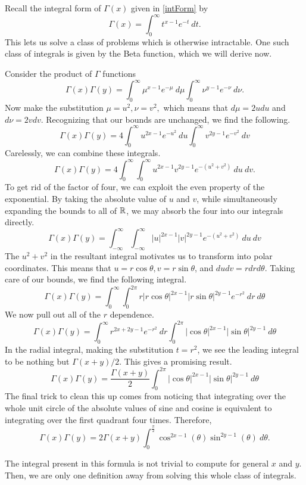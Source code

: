 Recall the integral form of $\Gamma(x)$ given in \eqref{intForm} by
$$\Gamma(x) = \int_{0}^\infty t^{x-1} e^{-t} \ dt.$$
This lets us solve a class of problems which is otherwise intractable. 
One such class of integrals is given by the Beta function, which we will derive now.

Consider the product of $\Gamma$ functions
$$\Gamma(x)\Gamma(y) = \int_{0}^\infty \mu^{x-1} e^{-\mu} \ d\mu \int_{0}^\infty \nu^{y-1} e^{-\nu} \ d\nu.$$
Now make the substitution $\mu = u^2, \nu = v^2,$ which means that $d\mu = 2 u du$ and $d\nu = 2 vdv.$
Recognizing that our bounds are unchanged, we find the following.
$$\Gamma(x)\Gamma(y) = 4\int_{0}^\infty u^{2x-1} e^{-u^2} \ du \int_{0}^\infty v^{2y-1} e^{-v^2} \ dv$$
Carelessly, we can combine these integrals.
$$\Gamma(x)\Gamma(y) = 4\int_{0}^\infty \int_{0}^\infty u^{2x-1} v^{2y-1} e^{-(u^2 + v^2)} \ du \ dv.$$
To get rid of the factor of four, we can exploit the even property of the exponential.
By taking the absolute value of $u$ and $v$, while simultaneously expanding the bounds to all of $\mathbb{R}$, we may absorb the four into our integrals directly.
$$\Gamma(x)\Gamma(y) = \int_{-\infty}^\infty \int_{-\infty}^\infty |u|^{2x-1} |v|^{2y-1} e^{-(u^2 + v^2)} \ du \ dv$$
The $u^2 + v^2$ in the resultant integral motivates us to transform into polar coordinates.
This means that $u = r \cos \theta, v = r \sin \theta$, and $du dv = r dr d\theta$.
Taking care of our bounds, we find the following integral.
$$\Gamma(x)\Gamma(y) =  \int_{0}^\infty \int_{0}^{2\pi} r |r\cos \theta|^{2x-1} |r\sin \theta|^{2y-1} e^{-r^2} \ dr \ d\theta$$
We now pull out all of the $r$ dependence. 
$$\Gamma(x)\Gamma(y) = \int_{0}^\infty r^{2x + 2y - 1} e^{-r^2} \ dr \int_{0}^{2\pi} |\cos \theta|^{2x-1} |\sin \theta|^{2y-1} \ d\theta$$
In the radial integral, making the substitution $t = r^2$, we see the leading integral to be nothing but $\Gamma(x + y)/2$.
This gives a promising result.
$$\Gamma(x)\Gamma(y) = \frac{\Gamma(x+y)}{2} \int_{0}^{2\pi} |\cos \theta|^{2x-1} |\sin \theta|^{2y-1} \ d\theta$$
The final trick to clean this up comes from noticing that integrating over the whole unit circle of the absolute values of sine and cosine is equivalent to integrating over the first quadrant four times.
Therefore,
$$\Gamma(x)\Gamma(y) = 2\Gamma(x+y) \int_{0}^{\frac{\pi}{2}} \cos^{2x-1} (\theta) \sin^{2y-1} (\theta) \ d\theta.$$

The integral present in this formula is not trivial to compute for general $x$ and $y$.
Then, we are only one definition away from solving this whole class of integrals.

